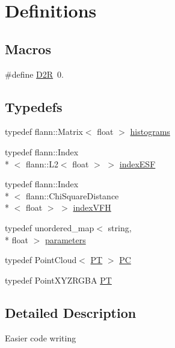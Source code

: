 \hypertarget{group__Definitions}{\section{Definitions}
\label{group__Definitions}
}
\subsection*{Macros}
\begin{DoxyCompactItemize}
\item 
\#define \hyperlink{group__Definitions_ga0a3cc1d5cde549e408f825ddd7f5853d}{D2\-R}~0.
\end{DoxyCompactItemize}
\subsection*{Typedefs}
\begin{DoxyCompactItemize}
\item 
typedef flann\-::\-Matrix$<$ float $>$ \hyperlink{group__Definitions_ga136493056b2eaf642f660e6a45a62991}{histograms}
\item 
typedef flann\-::\-Index\\*
$<$ flann\-::\-L2$<$ float $>$ $>$ \hyperlink{group__Definitions_ga3f45d3216269cf676ea864ae3bfcc446}{index\-E\-S\-F}
\item 
typedef flann\-::\-Index\\*
$<$ flann\-::\-Chi\-Square\-Distance\\*
$<$ float $>$ $>$ \hyperlink{group__Definitions_gacea1a4bf0f6b886a58ff00ff9cb54b34}{index\-V\-F\-H}
\item 
typedef unordered\-\_\-map$<$ string, \\*
float $>$ \hyperlink{group__Definitions_gacbb28d8f791bb363852e522cf3b83c47}{parameters}
\item 
typedef Point\-Cloud$<$ \hyperlink{group__Definitions_ga102df08e7bbccbe3fa6e0b53fd9bac74}{P\-T} $>$ \hyperlink{group__Definitions_ga62eb21fcfa3189c5de50fb62a2a7a79e}{P\-C}
\item 
typedef Point\-X\-Y\-Z\-R\-G\-B\-A \hyperlink{group__Definitions_ga102df08e7bbccbe3fa6e0b53fd9bac74}{P\-T}
\end{DoxyCompactItemize}


\subsection{Detailed Description}
Easier code writing 

